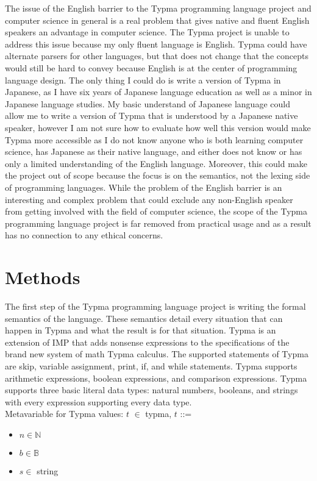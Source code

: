 \documentclass[10pt,twocolumn]{article}
\begin{document}
The issue of the English barrier to the Typma programming language project and computer science in general is a real problem that gives native and fluent English speakers an advantage in computer science. The Typma project is unable to address this issue because my only fluent language is English. Typma could have alternate parsers for other languages, but that does not change that the concepts would still be hard to convey because English is at the center of programming language design. The only thing I could do is write a version of Typma in Japanese, as I have six years of Japanese language education as well as a minor in Japanese language studies. My basic understand of Japanese language could allow me to write a version of Typma that is understood by a Japanese native speaker, however I am not sure how to evaluate how well this version would make Typma more accessible as I do not know anyone who is both learning computer science, has Japanese as their native language, and either does not know or has only a limited understanding of the English language. Moreover, this could make the project out of scope because the focus is on the semantics, not the lexing side of programming languages. While the problem of the English barrier is an interesting and complex problem that could exclude any non-English speaker from getting involved with the field of computer science, the scope of the Typma programming language project is far removed from practical usage and as a result has no connection to any ethical concerns.

\section{Methods}

The first step of the Typma programming language project is writing the formal semantics of the language. These semantics detail every situation that can happen in Typma and what the result is for that situation. Typma is an extension of IMP that adds nonsense expressions to the specifications of the brand new system of math Typma calculus. The supported statements of Typma are skip, variable assignment, print, if, and while statements. Typma supports arithmetic expressions, boolean expressions, and comparison expressions. Typma supports three basic literal data types: natural numbers, booleans, and strings with every expression supporting every data type.
\\

Metavariable for Typma values: $t$ $\in$ typma, $t$ ::=
\begin{itemize}
  \item $n \in \mathbb{N}$
  \item $b \in \mathbb{B}$
  \item $s \in$ string
 \end{itemize}
\end{document}
